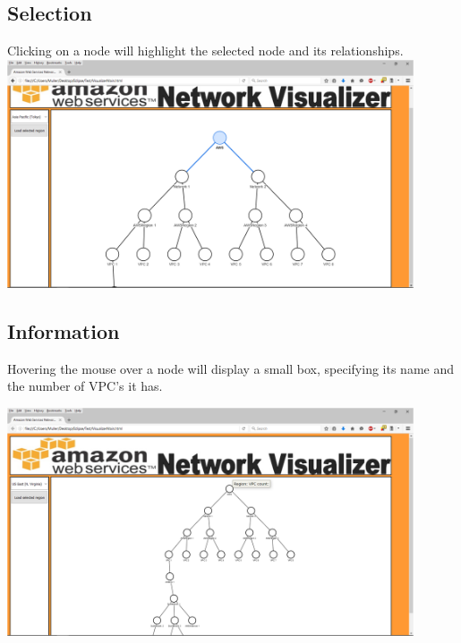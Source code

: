 \documentclass[hidelinks,a4paper,12pt]{article}
\begin{document}
	\subsection{Selection}
	Clicking on a node will highlight the selected node and its relationships.
	\newline
		\includegraphics[width=0.9\textwidth]{./images/Visualizer7.png}
		
		\newpage
	\subsection{Information}
	Hovering the mouse over a node will display a small box, specifying its name and the number of VPC's it has.
	
	\includegraphics[width=0.9\textwidth]{./images/Visualizer8.png}
	\newline
	
\end{document}
